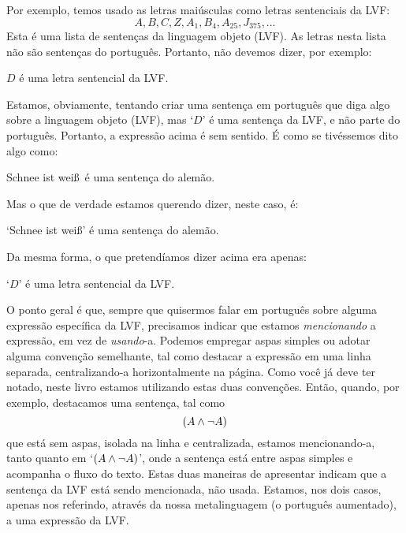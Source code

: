 Por exemplo, temos usado as letras maiúsculas como letras sentenciais da LVF:
	$$A, B, C, Z, A_1, B_4, A_{25}, J_{375},\ldots$$
Esta é uma lista de sentenças da linguagem objeto (LVF).
As letras nesta lista não são sentenças do português.
Portanto, não devemos dizer, por exemplo:
	\begin{ebullet}
		\item $D$ é uma letra sentencial da LVF.
	\end{ebullet}
Estamos, obviamente, tentando criar uma sentença em português que diga algo sobre a linguagem objeto (LVF), mas `$D$' é uma sentença da LVF, e não parte do português.
Portanto, a expressão acima é sem sentido.
É como se tivéssemos dito algo como:
	\begin{ebullet}
		\item Schnee ist wei\ss\ é uma sentença do alemão.
	\end{ebullet}
Mas o que de verdade estamos querendo dizer, neste caso, é:
	\begin{ebullet}
		\item `Schnee ist wei\ss' é uma sentença do alemão.
	\end{ebullet}
Da mesma forma, o que pretendíamos dizer acima era apenas:
	\begin{ebullet}
		\item `$D$' é uma letra sentencial da LVF.
	\end{ebullet}
O ponto geral é que, sempre que quisermos falar em português sobre alguma expressão específica da LVF, precisamos indicar que estamos \emph{mencionando} a expressão, em vez de \emph{usando}-a.
Podemos empregar aspas simples ou adotar alguma convenção semelhante, tal como destacar a expressão em uma linha separada, centralizando-a horizontalmente na página.
Como você já deve ter notado, neste livro estamos utilizando estas duas convenções.
Então, quando, por exemplo, destacamos uma sentença, tal como $$(A \wedge \neg A)$$ que está sem aspas, isolada na linha e centralizada, estamos mencionando-a, tanto quanto em `$(A \wedge \neg A)$', onde a sentença está entre aspas simples e acompanha o fluxo do texto.
Estas duas maneiras de apresentar indicam que a sentença da LVF está sendo mencionada, não usada.
Estamos, nos dois casos, apenas nos referindo, através da nossa metalinguagem (o português aumentado), a uma expressão da LVF.


